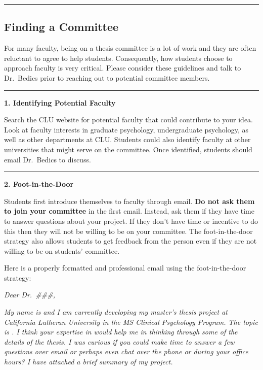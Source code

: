 \documentclass[
  openany]{book}
\begin{document}
\begin{center}\rule{0.5\linewidth}{0.5pt}\end{center}

\hypertarget{finding-a-committee}{%
\subsection{Finding a Committee}\label{finding-a-committee}}

For many faculty, being on a thesis committee is a lot of work and they are often reluctant to agree to help students. Consequently, how students choose to approach faculty is very critical. Please consider these guidelines and talk to Dr.~Bedics prior to reaching out to potential committee members.

\begin{center}\rule{0.5\linewidth}{0.5pt}\end{center}

\textbf{1. Identifying Potential Faculty}

Search the CLU website for potential faculty that could contribute to your idea. Look at faculty interests in graduate psychology, undergraduate psychology, as well as other departments at CLU. Students could also identify faculty at other universities that might serve on the committee. Once identified, students should email Dr.~Bedics to discuss.

\begin{center}\rule{0.5\linewidth}{0.5pt}\end{center}

\textbf{2. Foot-in-the-Door}

Students first introduce themselves to faculty through email. \textbf{Do not ask them to join your committee} in the first email. Instead, ask them if they have time to answer questions about your project. If they don't have time or incentive to do this then they will not be willing to be on your committee. The foot-in-the-door strategy also allows students to get feedback from the person even if they are not willing to be on students' committee.

Here is a properly formatted and professional email using the foot-in-the-door strategy:

\emph{Dear Dr.~\#\#\#,}

\emph{My name is and I am currently developing my master's thesis project at California Lutheran University in the MS Clinical Psychology Program. The topic is . I think your expertise in would help me in thinking through some of the details of the thesis. I was curious if you could make time to answer a few questions over email or perhaps even chat over the phone or during your office hours? I have attached a brief summary of my project.}
\end{document}
